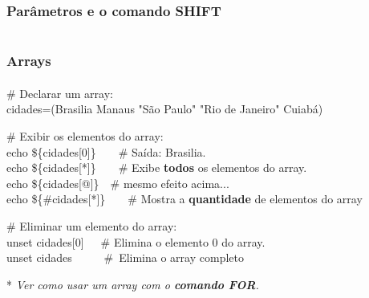 \documentclass[aspectratio=1610]{beamer}
\begin{document}
\section [Parâmetros]{}
\begin{frame}
  \frametitle{Parâmetros e o comando SHIFT}
  \framesubtitle{}

\end{frame}


\section [Arrays]{}
\begin{frame}
  \frametitle{Arrays}
  \framesubtitle{}

\begin{block}{}
	\# Declarar um array:\\
	cidades=(Brasilia Manaus "São Paulo" "Rio de Janeiro" Cuiabá)
\end{block}

\begin{block}{}
	\# Exibir os elementos do array:\\
	echo \$\{cidades[0]\}\ \ \ \ \# Saída: Brasilia.\\
	echo \$\{cidades[*]\}\ \ \ \ \# Exibe \textbf{todos} os elementos do array.\\
	echo \$\{cidades[@]\}\ \  \# mesmo efeito acima...\\
	echo \$\{#cidades[*]\}\ \ \ \ \# Mostra a \textbf{quantidade} de elementos do array\\
\end{block}

\begin{block}{}
	\# Eliminar um elemento do array:\\
	unset cidades[0]\ \ \ \# Elimina o elemento 0 do array.\\
	unset cidades \ \ \ \ \ \#\ Elimina o array completo
\end{block}

* \textit{Ver como usar um array com o \textbf{comando FOR}.}


\end{frame}
\end{document}

